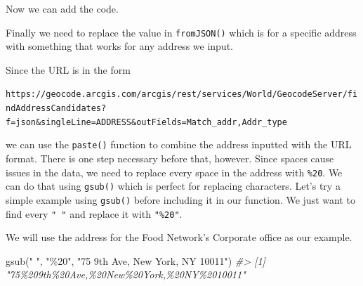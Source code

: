 \documentclass[
  12pt,
  openany]{book}
\newenvironment{Shaded}{\begin{snugshade}}{\end{snugshade}}
\newcommand{\CommentTok}[1]{\textcolor[rgb]{0.37,0.37,0.37}{\textit{#1}}}
\newcommand{\ControlFlowTok}[1]{\textcolor[rgb]{0.27,0.27,0.27}{\textbf{#1}}}
\newcommand{\DecValTok}[1]{\textcolor[rgb]{0.06,0.06,0.06}{#1}}
\newcommand{\FunctionTok}[1]{\textcolor[rgb]{0,0,0}{#1}}
\newcommand{\NormalTok}[1]{#1}
\newcommand{\OtherTok}[1]{\textcolor[rgb]{0.37,0.37,0.37}{#1}}
\newcommand{\SpecialCharTok}[1]{\textcolor[rgb]{0,0,0}{#1}}
\newcommand{\StringTok}[1]{\textcolor[rgb]{0.5,0.5,0.5}{#1}}
\begin{document}
Now we can add the code.

\begin{Shaded}
\end{Shaded}

Finally we need to replace the value in \texttt{fromJSON()} which is for a specific address with something that works for any address we input.

Since the URL is in the form

\texttt{https://geocode.arcgis.com/arcgis/rest/services/World/GeocodeServer/findAddressCandidates?f=json\&singleLine=ADDRESS\&outFields=Match\_addr,Addr\_type}

we can use the \texttt{paste()} function to combine the address inputted with the URL format. There is one step necessary before that, however. Since spaces cause issues in the data, we need to replace every space in the address with \texttt{\%20}. We can do that using \texttt{gsub()} which is perfect for replacing characters. Let's try a simple example using \texttt{gsub()} before including it in our function. We just want to find every \texttt{"\ "} and replace it with \texttt{"\%20"}.

We will use the address for the Food Network's Corporate office as our example.

\begin{Shaded}
\begin{Highlighting}[]
\FunctionTok{gsub}\NormalTok{(}\StringTok{" "}\NormalTok{, }\StringTok{"\%20"}\NormalTok{, }\StringTok{"75 9th Ave, New York, NY 10011"}\NormalTok{)}
\CommentTok{\#\textgreater{} [1] "75\%209th\%20Ave,\%20New\%20York,\%20NY\%2010011"}
\end{Highlighting}
\end{Shaded}
\end{document}
